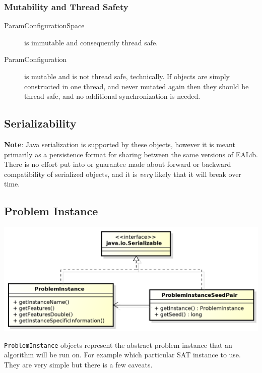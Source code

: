 \documentclass[11pt,letterpaper,oneside]{article}
\begin{document}
\subsubsection{Mutability and Thread Safety}

\begin{description}
\item[ParamConfigurationSpace] is immutable and consequently thread safe.
\item[ParamConfiguration] is mutable and is not thread safe, technically. If objects are simply constructed in one thread, and never mutated again then they should be thread safe, and no additional synchronization is needed.
\end{description}

\subsection{Serializability}

\textbf{Note}: Java serialization is supported by these objects, however it is meant primarily as a persistence format for sharing between the same versions of EALib. There is no effort put into or guarantee made about forward or backward compatibility of serialized objects, and it is \emph{very} likely that it will break over time.

\subsection{Problem Instance}


\begin{center}
\includegraphics[scale=0.75]{img/UML/pi.png}
\end{center}

\texttt{ProblemInstance} objects represent the abstract problem instance that an algorithm will be run on. For example which particular SAT instance to use. They are very simple but there is a few caveats.
\end{document}
